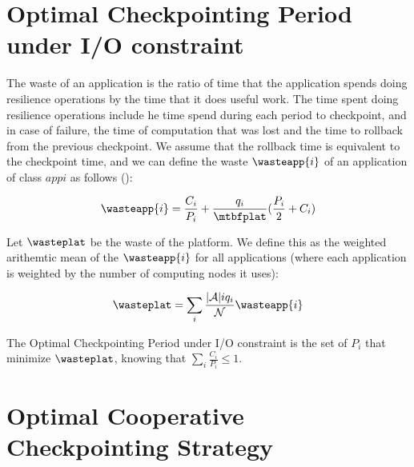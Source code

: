 \documentclass{article}
\newcommand{\nbnodesplat}{{\mathcal N}}
\newcommand{\nbapps}{|{\mathcal A}|}
\newcommand{\nbnodes}[1]{q_{#1}}
\newcommand{\period}[1]{P_{#1}}
\newcommand{\ckpt}[1]{C_{#1}}
\begin{document}
\section{Optimal Checkpointing Period under I/O constraint}
\label{sec.optimal}

The waste of an application is the ratio of time that the application spends doing
resilience operations by the time that it does useful work. The time
spent doing resilience operations include he time spend during each period to
checkpoint, and in case of failure, the time of computation that was
lost and the time to rollback from the previous checkpoint. We assume
that the rollback time is equivalent to the checkpoint time, and we
can define the waste $\wasteapp{i}$ of an application of class
$app{i}$ as follows (\cite{daly}):

$$\wasteapp{i} = \frac{\ckpt{i}}{\period{i}} +
\frac{\nbnodes{i}}{\mtbfplat}(\frac{\period{i}}{2} + \ckpt{i})$$

Let $\wasteplat$ be the waste of the platform. We define this as the
weighted arithemtic mean of the $\wasteapp{i}$ for all applications
(where each application is weighted by the number of computing nodes
it uses):

$$\wasteplat = \sum_i \frac{\nbapps{i} \nbnodes{i}}{\nbnodesplat} \wasteapp{i}$$

\todo{Explain why $\sum_i \frac{\ckpt{i}}{\period{i}}\leq 1$}

The Optimal Checkpointing Period under I/O constraint is the set of
$\period{i}$ that minimize $\wasteplat$, knowing that $\sum_i
\frac{\ckpt{i}}{\period{i}} \leq 1$.

\section{Optimal Cooperative Checkpointing Strategy}
\label{sec.strategy}
\end{document}
